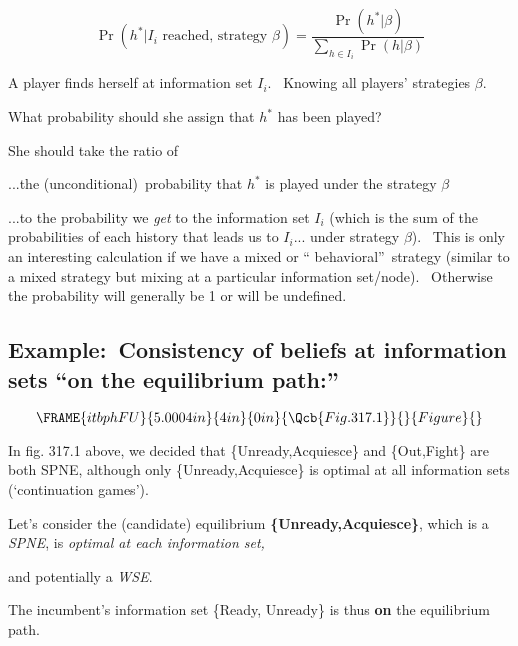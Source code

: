 \documentclass{article}
\begin{document}
\[
\Pr (h^{\ast }|I_{i}\text{ reached, strategy }\beta )=\frac{\Pr (h^{\ast
}|\beta )}{\sum\limits_{h\in I_{i}}\Pr (h|\beta )}
\]

A player finds herself at information set $I_{i}$. \ Knowing all players'
strategies $\beta $. \

What probability should she assign that $h^{\ast }$ has been played? \

She should take the ratio of

...the (unconditional)\ probability that $h^{\ast }$ is played under the
strategy $\beta $ \

...to the probability we \textit{get }to the information set $I_{i}$ (which
is the sum of the probabilities of each history that leads us to $I_{i}$...
under strategy $\beta $). \ {\footnotesize This is only an interesting
calculation if we have a mixed or \textquotedblleft
behavioral\textquotedblright\ strategy (similar to a mixed strategy but
mixing at a particular information set/node). \ Otherwise the probability
will generally be 1 or will be undefined.}

\bigskip

\subsection{Example:\ Consistency of beliefs at information sets
\textquotedblleft on the equilibrium path:\textquotedblright}

\[
\FRAME{itbphFU}{5.0004in}{4in}{0in}{\Qcb{Fig. 317.1}}{}{Figure}{\special%
{language "Scientific Word";type "GRAPHIC";maintain-aspect-ratio
TRUE;display "USEDEF";valid_file "T";width 5.0004in;height 4in;depth
0in;original-width 5.6886in;original-height 3.5201in;cropleft "0";croptop
"1";cropright "1";cropbottom "0";tempfilename
'JSHANV2X.wmf';tempfile-properties "XPR";}}
\]

In fig. 317.1 above, we decided that \{Unready,Acquiesce\} and \{Out,Fight\}
are both SPNE, although only \{Unready,Acquiesce\} is optimal at all
information sets (`continuation games').

\bigskip

Let's consider the (candidate) equilibrium \textbf{\{Unready,Acquiesce\}},
which is a \textit{SPNE}, is \textit{optimal at each information set,}

and potentially a \textit{WSE}.

\bigskip

The incumbent's information set \{Ready, Unready\} is thus \textbf{on} the
equilibrium path. \
\end{document}
